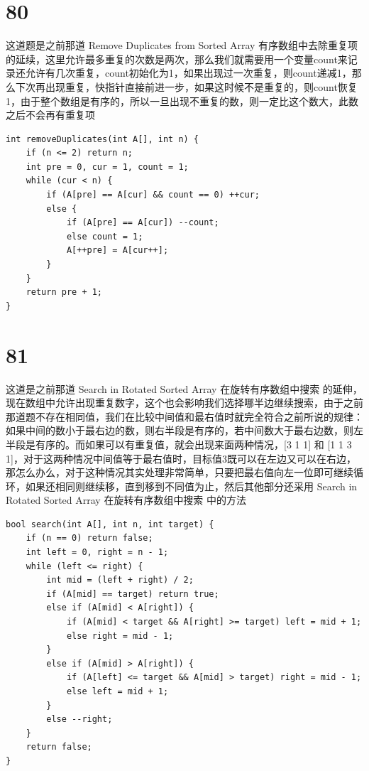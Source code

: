 \documentclass[12pt,a4paper]{article}
\begin{document}
\section{80}
\begin{CJK}{UTF8}{gbsn}
这道题是之前那道 Remove Duplicates from Sorted Array 有序数组中去除重复项 的延续，这里允许最多重复的次数是两次，那么我们就需要用一个变量count来记录还允许有几次重复，count初始化为1，如果出现过一次重复，则count递减1，那么下次再出现重复，快指针直接前进一步，如果这时候不是重复的，则count恢复1，由于整个数组是有序的，所以一旦出现不重复的数，则一定比这个数大，此数之后不会再有重复项
\end{CJK}
\begin{lstlisting}
int removeDuplicates(int A[], int n) {
	if (n <= 2) return n;
	int pre = 0, cur = 1, count = 1;
	while (cur < n) {
		if (A[pre] == A[cur] && count == 0) ++cur;
		else {
			if (A[pre] == A[cur]) --count;
			else count = 1;
			A[++pre] = A[cur++];
		}
	}
	return pre + 1;
}
\end{lstlisting}

\section{81}
\begin{CJK}{UTF8}{gbsn}
这道是之前那道 Search in Rotated Sorted Array 在旋转有序数组中搜索 的延伸，现在数组中允许出现重复数字，这个也会影响我们选择哪半边继续搜索，由于之前那道题不存在相同值，我们在比较中间值和最右值时就完全符合之前所说的规律：如果中间的数小于最右边的数，则右半段是有序的，若中间数大于最右边数，则左半段是有序的。而如果可以有重复值，就会出现来面两种情况，[3 1 1] 和 [1 1 3 1]，对于这两种情况中间值等于最右值时，目标值3既可以在左边又可以在右边，那怎么办么，对于这种情况其实处理非常简单，只要把最右值向左一位即可继续循环，如果还相同则继续移，直到移到不同值为止，然后其他部分还采用 Search in Rotated Sorted Array 在旋转有序数组中搜索 中的方法
\end{CJK}
\begin{lstlisting}
bool search(int A[], int n, int target) {
	if (n == 0) return false;
	int left = 0, right = n - 1;
	while (left <= right) {
		int mid = (left + right) / 2;
		if (A[mid] == target) return true;
		else if (A[mid] < A[right]) {
			if (A[mid] < target && A[right] >= target) left = mid + 1;
			else right = mid - 1;
		}
		else if (A[mid] > A[right]) {
			if (A[left] <= target && A[mid] > target) right = mid - 1;
			else left = mid + 1;
		}
		else --right;
	}
	return false;
}
\end{lstlisting}
\end{document}
